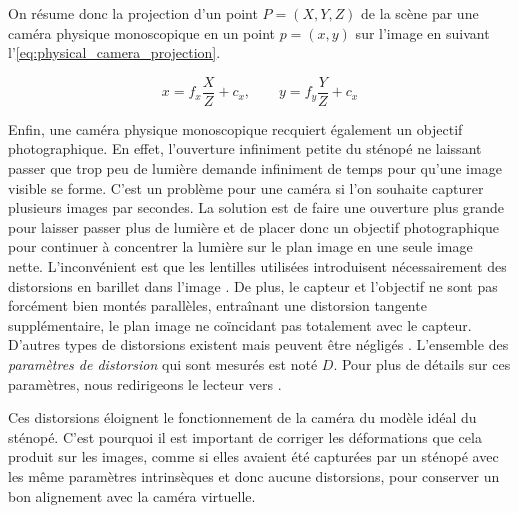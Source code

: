 On résume donc la projection d'un point $P=(X,Y,Z)$ de la scène par une caméra physique monoscopique en un point $p=(x,y)$ sur l'image en suivant l'\autoref{eq:physical_camera_projection}.

\begin{equation}
  \label{eq:physical_camera_projection}
  x = f_x \frac{X}{Z} + c_x,\qquad y = f_y \frac{Y}{Z} + c_x
\end{equation}

Enfin, une caméra physique monoscopique recquiert également un objectif photographique. En effet, l'ouverture infiniment petite du sténopé ne laissant passer que trop peu de lumière demande infiniment de temps pour qu'une image visible se forme. C'est un problème pour une caméra si l'on souhaite capturer plusieurs images par secondes. La solution est de faire une ouverture plus grande pour laisser passer plus de lumière et de placer donc un objectif photographique pour continuer à concentrer la lumière sur le plan image en une seule image nette. L'inconvénient est que les lentilles utilisées introduisent nécessairement des distorsions en barillet dans l'image . De plus, le capteur et l'objectif ne sont pas forcément bien montés parallèles, entraînant une distorsion tangente supplémentaire, le plan image ne coïncidant pas totalement avec le capteur. D'autres types de distorsions existent mais peuvent être négligés \citep[p. 377]{Bradski2008}. L'ensemble des \emph{paramètres de distorsion} qui sont mesurés est noté $D$. Pour plus de détails sur ces paramètres, nous redirigeons le lecteur vers \cite[p. 375]{Bradski2008}.


Ces distorsions éloignent le fonctionnement de la caméra du modèle idéal du sténopé. C'est pourquoi il est important de corriger les déformations que cela produit sur les images, comme si elles avaient été capturées par un sténopé avec les même paramètres intrinsèques et donc aucune distorsions, pour conserver un bon alignement avec la caméra virtuelle.

